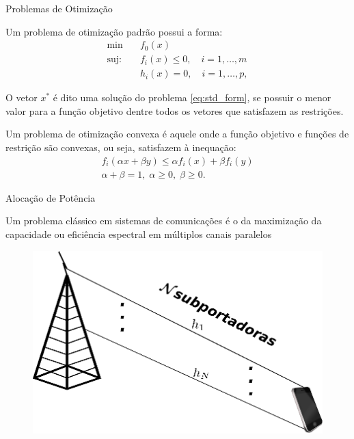 \begin{frame}{Problemas de Otimização}
 \begin{bigitem} 
   \item Um problema de otimização padrão possui a forma:
   \begin{align}\label{eq:std_form}
       \min\quad &f_0(x)\\
        \text{suj:}\quad &f_i(x) \leq 0,\quad i=1,\ldots,m\\
                   &h_i(x) =0,\quad i=1,\ldots,p,
   \end{align}
   \item O vetor $x^*$ é dito uma solução do problema \eqref{eq:std_form}, se possuir o menor valor para a função objetivo dentre todos os vetores que satisfazem as restrições.
   \item Um problema de otimização convexa é aquele onde a função objetivo e funções de restrição são convexas, ou seja, satisfazem à inequação:
   \begin{gather}\label{eq:con_pro}
       f_i(\alpha x +\beta y) \leq \alpha f_i(x) + \beta f_i(y)\\
       \alpha + \beta = 1,\; \alpha \geq 0,\;\beta \geq 0.
   \end{gather}
 \end{bigitem}
\end{frame}

\begin{frame}{Alocação de Potência}
   \begin{bigitem}
      \item Um problema clássico em sistemas de comunicações é o da maximização da capacidade ou eficiência espectral em múltiplos canais paralelos
      \begin{figure}[!htb]
         \centering
         \includegraphics[width=0.50\linewidth]{../Imagens/cap_max_pr.eps}
     \end{figure}
  \end{bigitem}
\end{frame}

